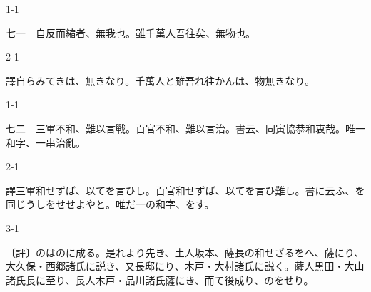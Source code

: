 \documentclass[tate,paper=b6j,jafontsize=9pt]{jlreq}
\begin{document}
\begin{azconvIndented}{1\zw}{-1\zw}

七一　自反而縮者、無我也。雖千萬人吾往矣、無物也。

\end{azconvIndented}
\begin{azconvIndented}{2\zw}{-1\zw}

譯自らみてきは、無きなり。千萬人と雖吾れ往かんは、物無きなり。

\end{azconvIndented}

\begin{azconvIndented}{1\zw}{-1\zw}

七二　三軍不和、難以言\azconvKunten{\azconvIR}戰。百官不和、難以言\azconvKunten{\azconvIR}治。書云、同寅協恭和衷哉。唯一和字、一串治亂。

\end{azconvIndented}
\begin{azconvIndented}{2\zw}{-1\zw}

譯三軍和せずば、以てを言ひし。百官和せずば、以てを言ひ難し。書に云ふ、を同じうしをせせよやと。唯だ一の和字、をす。

\end{azconvIndented}
\begin{azconvIndented}{3\zw}{-1\zw}

〔評〕のはのに成る。是れより先き、土人坂本、薩長の和せざるをへ、薩にり、大久保・西郷諸氏に説き、又長邸にり、木戸・大村諸氏に説く。薩人黒田・大山諸氏長に至り、長人木戸・品川諸氏薩にき、而て後成り、のをせり。

\end{azconvIndented}
\end{document}

